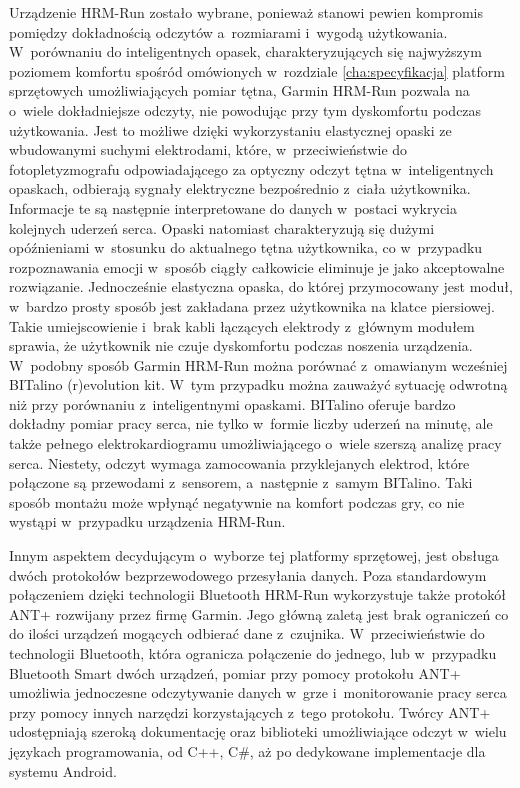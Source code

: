 Urządzenie HRM-Run zostało wybrane, ponieważ stanowi pewien kompromis pomiędzy dokładnością odczytów a~rozmiarami i~wygodą użytkowania. W~porównaniu do inteligentnych opasek, charakteryzujących się najwyższym poziomem komfortu spośród omówionych w~rozdziale \ref{cha:specyfikacja} platform sprzętowych umożliwiających pomiar tętna, Garmin HRM-Run pozwala na o~wiele dokładniejsze odczyty, nie powodując przy tym dyskomfortu podczas użytkowania. Jest to możliwe dzięki wykorzystaniu elastycznej opaski ze wbudowanymi suchymi elektrodami, które, w~przeciwieństwie do fotopletyzmografu odpowiadającego za optyczny odczyt tętna w~inteligentnych opaskach, odbierają sygnały elektryczne bezpośrednio z~ciała użytkownika. Informacje te są następnie interpretowane do danych w~postaci wykrycia kolejnych uderzeń serca. Opaski natomiast charakteryzują się dużymi opóźnieniami w~stosunku do aktualnego tętna użytkownika, co w~przypadku rozpoznawania emocji w~sposób ciągły całkowicie eliminuje je jako akceptowalne rozwiązanie. Jednocześnie elastyczna opaska, do której przymocowany jest moduł, w~bardzo prosty sposób jest zakładana przez użytkownika na klatce piersiowej. Takie umiejscowienie i~brak kabli łączących elektrody z~głównym modułem sprawia, że użytkownik nie czuje dyskomfortu podczas noszenia urządzenia. W~podobny sposób Garmin HRM-Run można porównać z~omawianym wcześniej BITalino (r)evolution kit. W~tym przypadku można zauważyć sytuację odwrotną niż przy porównaniu z~inteligentnymi opaskami. BITalino oferuje bardzo dokładny pomiar pracy serca, nie tylko w~formie liczby uderzeń na minutę, ale także pełnego elektrokardiogramu umożliwiającego o~wiele szerszą analizę pracy serca. Niestety, odczyt wymaga zamocowania przyklejanych elektrod, które połączone są przewodami z~sensorem, a~następnie z~samym BITalino. Taki sposób montażu może wpłynąć negatywnie na komfort podczas gry, co nie wystąpi w~przypadku urządzenia HRM-Run.

Innym aspektem decydującym o~wyborze tej platformy sprzętowej, jest obsługa dwóch protokołów bezprzewodowego przesyłania danych. Poza standardowym połączeniem dzięki technologii Bluetooth HRM-Run wykorzystuje także protokół ANT+ rozwijany przez firmę Garmin. Jego główną zaletą jest brak ograniczeń co do ilości urządzeń mogących odbierać dane z~czujnika. W~przeciwieństwie do technologii Bluetooth, która ogranicza połączenie do jednego, lub w~przypadku Bluetooth Smart dwóch urządzeń, pomiar przy pomocy protokołu ANT+ umożliwia jednoczesne odczytywanie danych w~grze i~monitorowanie pracy serca przy pomocy innych narzędzi korzystających z~tego protokołu. Twórcy ANT+ udostępniają szeroką dokumentację oraz biblioteki umożliwiające odczyt w~wielu językach programowania, od C++, C\#, aż po dedykowane implementacje dla systemu Android.

